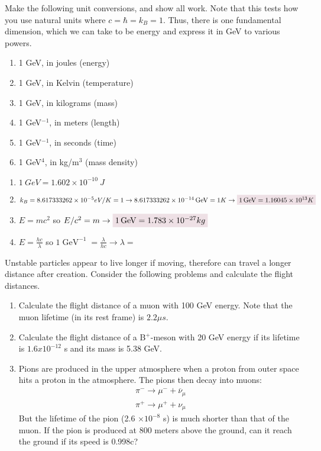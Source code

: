 \documentclass{article}
\date{Due: 01-19-2022}
\author{\EC}
\DeclareMathOperator{\GeV}{GeV}
\begin{document}
\maketitle
\begin{problem}
Make the following unit conversions, and show all work. 
Note that this tests how you use natural units where $c = \hbar = k_B = 1$. Thus, there is one 
fundamental dimension, which we can take to be energy and express it in GeV to various 
powers.
\begin{enumerate}[label=\alph*)]
    \item 1 GeV, in joules (energy) 
    \item 1 GeV, in Kelvin (temperature) 
    \item 1 GeV, in kilograms (mass) 
    \item 1 GeV$^{-1}$, in meters (length) 
    \item 1 GeV$^{-1}$, in seconds (time) 
    \item 1 GeV$^{4}$, in kg/m$^3$ (mass density) 
\end{enumerate}
\answerline
\begin{enumerate}[label=\alph*)]
    \item $1~GeV= 1.602\times10^{-10}~J$ 
    \item $k_B=8.617 333 262\times 10^{-5} eV/K=1
        \rightarrow
        8.617 333 262\times 10^{-14} \GeV=1K\rightarrow \coloredanswer{1\GeV=1.16045\times10^{13}K}$
    \item $E=mc^2$ so $E/c^2=m\rightarrow\coloredanswer{1\GeV=1.783 \times10^{-27} kg}$ 
    \item $E=\frac{hc}{\lambda}$ so $1\GeV^{-1}=\frac{\lambda}{hc}\rightarrow \lambda=$
\end{enumerate}
\end{problem}
\newpage
\begin{problem}
    Unstable particles appear to live longer if moving, therefore can travel a longer distance after creation. Consider the following problems and calculate the flight distances. 
    \begin{enumerate}
        \item Calculate the flight distance of a muon with 100 GeV energy. Note that the muon lifetime (in its rest frame) is $2.2 \mu s$. 
        \item Calculate the flight distance of a B$^{+}$-meson with 20 GeV energy if its lifetime is $1.6x10^{-12}$ s and its mass is 5.38 GeV. 
        \item Pions are produced in the upper atmosphere when a proton from outer space hits a proton in the atmosphere. The pions then decay into muons:
        \begin{gather*} 
            \pi^{-}\rightarrow \mu^{-}+\overline{\nu}_\mu
            \\
            \pi^{+}\rightarrow \mu^{+}+\nu_\mu
        \end{gather*}
        But the lifetime of the pion (2.6 $\times10^{-8}$ s) is much shorter than that of the muon. If the pion is produced at 800 meters above the ground, can it reach the ground if its speed is 0.998c?
    \end{enumerate}
    \answerline
\end{problem}
\end{document}
